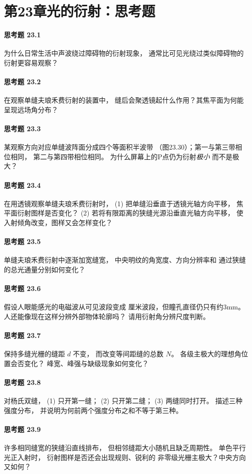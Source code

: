 \section*{第23章\quad 光的衍射：思考题}
\paragraph{思考题 23.1}
为什么日常生活中声波绕过障碍物的衍射现象，
通常比可见光绕过类似障碍物的衍射更容易观察？
\paragraph{思考题 23.2}
在观察单缝夫琅禾费衍射的装置中，
缝后会聚透镜起什么作用？其焦平面为何能呈现远场角分布？
\paragraph{思考题 23.3}
某观察方向对应单缝波阵面分成四个等面积半波带
（图23.30）；第一与第三带相位相同，
第二与第四带相位相同。
为什么屏幕上的P点仍为衍射\emph{极小}
而不是极大？
\paragraph{思考题 23.4}
在用透镜观察单缝夫琅禾费衍射时，
(1) 把单缝沿垂直于透镜光轴方向平移，
焦平面衍射图样是否变化？
(2) 若将有限距离的狭缝光源沿垂直光轴方向平移，
使入射倾角改变，图样又会怎样变化？
\paragraph{思考题 23.5}
单缝夫琅禾费衍射中逐渐加宽缝宽，
中央明纹的角宽度、方向分辨率和
通过狭缝的总光通量分别如何变化？
\paragraph{思考题 23.6}
假设人眼能感光的电磁波从可见波段变成
厘米波段，但瞳孔直径仍只有约3mm。
人还能像现在这样分辨外部物体轮廓吗？
请用衍射角分辨尺度判断。
\paragraph{思考题 23.7}
保持多缝光栅的缝距 \(d\) 不变，
而改变等间距缝的总数 \(N\)。
各级主极大的理想角位置会否变化？
峰宽、峰强与缺级现象如何变化？
\paragraph{思考题 23.8}
对杨氏双缝，
(1) 只开第一缝；
(2) 只开第二缝；
(3) 两缝同时打开。
描述三种强度分布，
并说明为何前两个强度分布之和不等于第三种。
\paragraph{思考题 23.9}
许多相同缝宽的狭缝沿直线排布，
但相邻缝距大小随机且缺乏周期性。
单色平行光正入射时，
衍射图样是否还会出现规则、锐利的
非零级光栅主极大？中央方向又如何？
